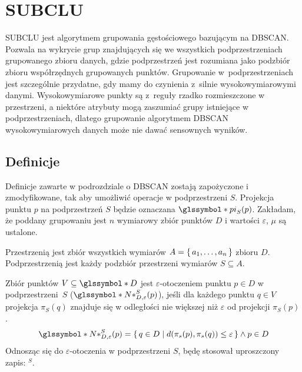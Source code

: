 \section{SUBCLU}

SUBCLU \cite{subclu} jest algorytmem grupowania gęstościowego bazującym na \linebreak DBSCAN. Pozwala na wykrycie grup znajdujących się we wszystkich podprzestrzeniach grupowanego zbioru danych, gdzie podprzestrzeń jest rozumiana jako podzbiór zbioru współrzędnych grupowanych punktów. Grupowanie \mbox{w podprzestrzeniach} jest szczególnie przydatne, gdy mamy do czynienia \mbox{z silnie} wysokowymiarowymi danymi. Wysokowymiarowe punkty są \mbox{z reguły} rzadko rozmieszczone w przestrzeni, a niektóre atrybuty mogą zaszumiać grupy istniejące w podprzestrzeniach, dlatego grupowanie algorytmem DBSCAN wysokowymiarowych danych może nie dawać sensownych wyników.

\subsection{Definicje}
Definicje zawarte w podrozdziale o DBSCAN zostają zapożyczone i zmodyfikowane, tak aby umożliwić operacje w podprzestrzeni $ S $. Projekcja punktu $ p $ na podprzestrzeń $ S $ będzie oznaczana $ \s{pi}_S(p) $. Zakładam, że poddany grupowaniu jest $ n $ wymiarowy zbiór punktów $ D $ i wartości $ \varepsilon $, $ \mu $ są ustalone.
\smallskip
\smallskip

\newline
 Przestrzenią jest zbiór wszystkich wymiarów $ A=\set{a_1,\dots,a_n} $ zbioru $ D $. Podprzestrzenią jest każdy podzbiór przestrzeni wymiarów $ S \subseteq A $.
\smallskip

\newline
Zbiór punktów $ V \subseteq \s{D} $ jest $ \varepsilon $-otoczeniem punktu $ p\in D $ w \mbox{podprzestrzeni $ S $} ($ \s{N*}^S_{D,\varepsilon}(p) $), jeśli dla każdego punktu $ q \in V $ projekcja $ \pi_S(q) $ znajduje się w odległości nie większej niż $ \varepsilon $ od projekcji $ \pi_S(p) $.
\begin{equation}
	\s{N*}^S_{D,\varepsilon}(p) = \set{q \in D | d(\pi_s(p), \pi_s(q)) \le \varepsilon} \land p\in D
\end{equation}
Odnosząc się do $ \varepsilon $-otoczenia w podprzestrzeni $ S $, będę stosował uproszczony zapis: \textit{$^S$}.
\smallskip


